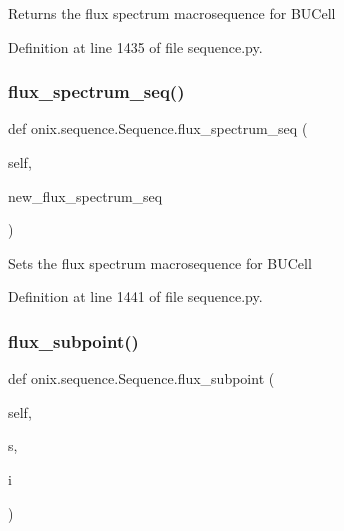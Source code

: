 \begin{DoxyVerb}Returns the flux spectrum macrosequence for BUCell
\end{DoxyVerb}
 

Definition at line 1435 of file sequence.\+py.

\mbox{\label{classonix_1_1sequence_1_1Sequence_a92e2986096244c35a1bb5ab86aa24db4}} 
\subsubsection{\texorpdfstring{flux\+\_\+spectrum\+\_\+seq()}{flux\_spectrum\_seq()}\hspace{0.1cm}{\footnotesize\ttfamily [2/2]}}
{\footnotesize\ttfamily def onix.\+sequence.\+Sequence.\+flux\+\_\+spectrum\+\_\+seq (\begin{DoxyParamCaption}\item[{}]{self,  }\item[{}]{new\+\_\+flux\+\_\+spectrum\+\_\+seq }\end{DoxyParamCaption})}

\begin{DoxyVerb}Sets the flux spectrum macrosequence for BUCell
\end{DoxyVerb}
 

Definition at line 1441 of file sequence.\+py.

\mbox{\label{classonix_1_1sequence_1_1Sequence_a8f803930e0bddcd26e986f48fa95c7b8}} 
\subsubsection{\texorpdfstring{flux\+\_\+subpoint()}{flux\_subpoint()}}
{\footnotesize\ttfamily def onix.\+sequence.\+Sequence.\+flux\+\_\+subpoint (\begin{DoxyParamCaption}\item[{}]{self,  }\item[{}]{s,  }\item[{}]{i }\end{DoxyParamCaption})}

